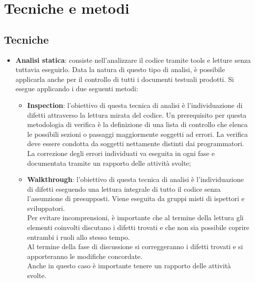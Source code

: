 \section{Tecniche e metodi}{
\subsection {Tecniche}{
	\begin{itemize}
		\item \textbf{Analisi statica}: consiste nell’analizzare il codice tramite tools e letture senza tuttavia eseguirlo. Data la natura di questo tipo di analisi, è possibile applicarla anche per il controllo di tutti i documenti testuali prodotti.
		Si esegue applicando i due seguenti metodi:
		\begin{itemize}
			\item \textbf{Inspection}: l’obiettivo di questa tecnica di analisi è l’individuazione di difetti attraverso la lettura mirata del codice. Un prerequisito per questa metodologia di verifica è la definizione di una lista di controllo che elenca le possibili sezioni o passaggi maggiormente soggetti ad errori. La verifica deve essere condotta da soggetti nettamente distinti dai programmatori. La correzione degli errori individuati va eseguita in ogni fase e documentata tramite un rapporto delle attività svolte;
			
			\item \textbf{Walkthrough}: l'obiettivo di questa tecnica di analisi è l'individuazione di difetti eseguendo una lettura integrale di tutto il codice senza l'assunzione di presupposti. Viene eseguita da gruppi misti di ispettori e sviluppatori. \\
			Per evitare incomprensioni, è importante che al termine della lettura gli elementi coinvolti discutano i difetti trovati e che non sia possibile coprire entrambi i ruoli allo stesso tempo. \\
			Al termine della fase di discussione si correggeranno i difetti trovati e si apporteranno le modifiche concordate.  \\
			Anche in questo caso è importante tenere un rapporto delle attività svolte.
		\end{itemize}
		

\end{itemize}}}
